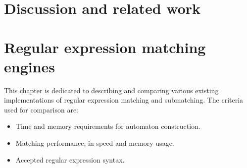 \section{Discussion and related work}

\section{Regular expression matching engines}

This chapter is dedicated to describing and comparing various existing
implementations of regular expression matching and submatching. The criteria
used for comparison are:

\begin{itemize}
   \item Time and memory requirements for automaton construction.
   \item Matching performance, in speed and memory usage.
   \item Accepted regular expression syntax.
\end{itemize}






